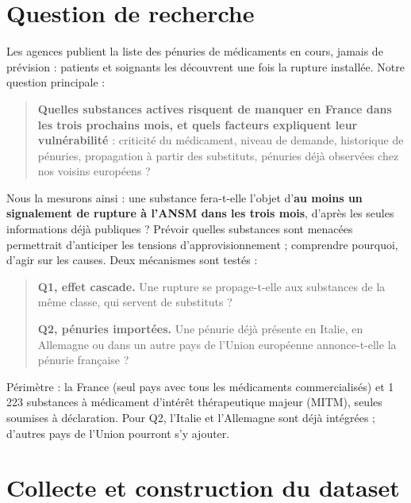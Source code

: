 
\section{Question de recherche}

Les agences publient la liste des pénuries de médicaments en cours, jamais de prévision : patients et soignants les
découvrent une fois la rupture installée. Notre question principale :

\begin{quote}
\large\textbf{Quelles substances actives risquent de manquer en France dans les trois prochains mois, et quels facteurs
expliquent leur vulnérabilité} : criticité du médicament, niveau de demande, historique de pénuries, propagation à
partir des substituts, pénuries déjà observées chez nos voisins européens ?
\end{quote}

Nous la mesurons ainsi : une substance fera-t-elle l'objet d'\textbf{au moins un signalement de rupture à l'ANSM dans les
trois mois}, d'après les seules informations déjà publiques ? Prévoir quelles substances sont menacées permettrait
d'anticiper les tensions d'approvisionnement ; comprendre pourquoi, d'agir sur les causes. Deux mécanismes sont testés :

\begin{quote}
\large\textbf{Q1, effet cascade.} Une rupture se propage-t-elle aux substances de la même classe, qui servent de
substituts ?

\bigskip
\large\textbf{Q2, pénuries importées.} Une pénurie déjà présente en Italie, en Allemagne ou dans un autre pays de
l'Union européenne annonce-t-elle la pénurie française ?
\end{quote}

Périmètre : la France (seul pays avec tous les médicaments commercialisés) et 1\,223 substances à médicament
d'intérêt thérapeutique majeur (MITM), seules soumises à déclaration. Pour Q2, l'Italie et l'Allemagne sont déjà intégrées ; d'autres pays de l'Union pourront s'y ajouter.

\section{Collecte et construction du dataset}

